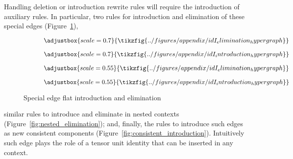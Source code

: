 Handling deletion or introduction rewrite rules will require the introduction of auxiliary rules.
In particular, two rules for introduction and elimination of these special edges (Figure~\ref{fig:idI_intro_elim}),
\ifdefined\ONECOLUMN
\begin{figure}[h!]
    \begin{subfigure}{0.45\linewidth}
        \[
        \adjustbox{scale=0.7}{
        \tikzfig{../figures/appendix/idI_elimination_hypergraph}
        }
        \]
    \end{subfigure}
    \hfill
    \begin{subfigure}{0.45\linewidth}
        \[
        \adjustbox{scale=0.7}{
        \tikzfig{../figures/appendix/idI_introduction_hypergraph}
        }
        \]
    \end{subfigure}
    \end{figure}
\else
\begin{figure}[h!]
\begin{subfigure}{0.45\linewidth}
    \[
    \adjustbox{scale=0.55}{
    \tikzfig{../figures/appendix/idI_elimination_hypergraph}
    }
    \]
\end{subfigure}
\hfill
\begin{subfigure}{0.45\linewidth}
    \[
    \adjustbox{scale=0.55}{
    \tikzfig{../figures/appendix/idI_introduction_hypergraph}
    }
    \]
\end{subfigure}
\caption{Special edge flat introduction and elimination}
\label{fig:idI_intro_elim}
\end{figure}
\fi
similar rules to introduce and eliminate in nested contexts (Figure~\ref{fig:nested_elimination});
and, finally, the rules to introduce such edges as new consistent components (Figure~\ref{fig:consistent_introduction}).
Intuitively such edge plays the role of a tensor unit identity that can be inserted in any context.

